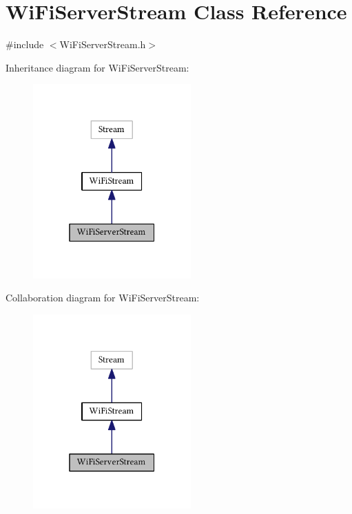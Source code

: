 \hypertarget{class_wi_fi_server_stream}{}\section{Wi\+Fi\+Server\+Stream Class Reference}
\label{class_wi_fi_server_stream}


{\ttfamily \#include $<$Wi\+Fi\+Server\+Stream.\+h$>$}



Inheritance diagram for Wi\+Fi\+Server\+Stream\+:\nopagebreak
\begin{figure}[H]
\begin{center}
\leavevmode
\includegraphics[width=172pt]{class_wi_fi_server_stream__inherit__graph}
\end{center}
\end{figure}


Collaboration diagram for Wi\+Fi\+Server\+Stream\+:\nopagebreak
\begin{figure}[H]
\begin{center}
\leavevmode
\includegraphics[width=172pt]{class_wi_fi_server_stream__coll__graph}
\end{center}
\end{figure}

